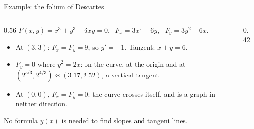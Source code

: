 \documentclass[10pt]{wosm-slides}
\begin{document}
\begin{frame}{Example: the folium of Descartes}
  \begin{columns}[c]
    \begin{column}{0.56\textwidth}
      $F(x, y) = x^3 + y^3 - 6xy = 0$. \ $F_x = 3x^2 - 6y$, \ $F_y = 3y^2 - 6x$.
      \pause
      \begin{itemize}
        \item At $(3, 3)$: $F_x = F_y = 9$, so $y' = -1$. Tangent: $x + y = 6$.
        \pause
        \item $F_y = 0$ where $y^2 = 2x$: on the curve, at the origin and at
          $(2^{5/3}, 2^{4/3}) \approx (3.17, 2.52)$, a vertical tangent.
        \pause
        \item At $(0, 0)$, $F_x = F_y = 0$: the curve crosses itself, and is a graph in neither
          direction.
      \end{itemize}
      \pause
      {\small No formula $y(x)$ is needed to find slopes and tangent lines.\par}
    \end{column}
    \begin{column}{0.42\textwidth}
      \centering
\end{column}
\end{columns}
\end{frame}
\end{document}
